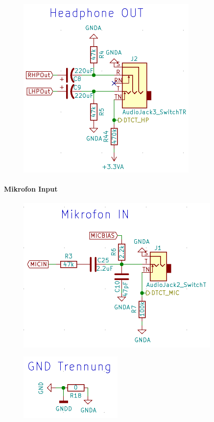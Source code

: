 \begin{figure} [H]
\begin{center}
 \includegraphics[scale=0.5]{../graphics/Schema_HPOUT.png}\caption{}
\label{fig:Schema_HPOUT}
\end{center}
\end{figure}




\paragraph{Mikrofon Input}
\label{par:MicIN}

\begin{figure} [H]
\begin{center}
\includegraphics[scale=0.5]{../graphics/Schema_MicIN.png}
\caption{}
\label{fig:Schema_MicIN}
\end{center}
\end{figure}

\begin{figure} [H]
\begin{center}
 \includegraphics[scale=0.5]{../graphics/Schema_GND.png} 
\caption{}
\label{fig:Schema_GND}
\end{center}
\end{figure}



 